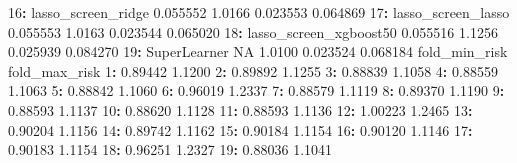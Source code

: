 \documentclass[12pt, krantz2,]{krantz}
\newenvironment{Shaded}{\begin{snugshade}}{\end{snugshade}}
\newcommand{\DecValTok}[1]{\textcolor[rgb]{0.06,0.06,0.06}{#1}}
\newcommand{\FloatTok}[1]{\textcolor[rgb]{0.06,0.06,0.06}{#1}}
\newcommand{\NormalTok}[1]{#1}
\newcommand{\OperatorTok}[1]{\textcolor[rgb]{0.43,0.43,0.43}{\textbf{#1}}}
\newcommand{\OtherTok}[1]{\textcolor[rgb]{0.37,0.37,0.37}{#1}}
\newcommand{\StringTok}[1]{\textcolor[rgb]{0.5,0.5,0.5}{#1}}
\theoremstyle{definition}
\theoremstyle{definition}
\theoremstyle{definition}
\newcommand{\1}{\mathbbm{1}}
\begin{document}
\begin{Shaded}
\begin{Highlighting}[]
\DecValTok{16}\OperatorTok{:}\StringTok{            }\NormalTok{lasso_screen_ridge     }\FloatTok{0.055552} \FloatTok{1.0166} \FloatTok{0.023553} \FloatTok{0.064869}
\DecValTok{17}\OperatorTok{:}\StringTok{            }\NormalTok{lasso_screen_lasso     }\FloatTok{0.055553} \FloatTok{1.0163} \FloatTok{0.023544} \FloatTok{0.065020}
\DecValTok{18}\OperatorTok{:}\StringTok{        }\NormalTok{lasso_screen_xgboost50     }\FloatTok{0.055516} \FloatTok{1.1256} \FloatTok{0.025939} \FloatTok{0.084270}
\DecValTok{19}\OperatorTok{:}\StringTok{                  }\NormalTok{SuperLearner           }\OtherTok{NA} \FloatTok{1.0100} \FloatTok{0.023524} \FloatTok{0.068184}
\NormalTok{    fold_min_risk fold_max_risk}
 \DecValTok{1}\OperatorTok{:}\StringTok{       }\FloatTok{0.89442}        \FloatTok{1.1200}
 \DecValTok{2}\OperatorTok{:}\StringTok{       }\FloatTok{0.89892}        \FloatTok{1.1255}
 \DecValTok{3}\OperatorTok{:}\StringTok{       }\FloatTok{0.88839}        \FloatTok{1.1058}
 \DecValTok{4}\OperatorTok{:}\StringTok{       }\FloatTok{0.88559}        \FloatTok{1.1063}
 \DecValTok{5}\OperatorTok{:}\StringTok{       }\FloatTok{0.88842}        \FloatTok{1.1060}
 \DecValTok{6}\OperatorTok{:}\StringTok{       }\FloatTok{0.96019}        \FloatTok{1.2337}
 \DecValTok{7}\OperatorTok{:}\StringTok{       }\FloatTok{0.88579}        \FloatTok{1.1119}
 \DecValTok{8}\OperatorTok{:}\StringTok{       }\FloatTok{0.89370}        \FloatTok{1.1190}
 \DecValTok{9}\OperatorTok{:}\StringTok{       }\FloatTok{0.88593}        \FloatTok{1.1137}
\DecValTok{10}\OperatorTok{:}\StringTok{       }\FloatTok{0.88620}        \FloatTok{1.1128}
\DecValTok{11}\OperatorTok{:}\StringTok{       }\FloatTok{0.88593}        \FloatTok{1.1136}
\DecValTok{12}\OperatorTok{:}\StringTok{       }\FloatTok{1.00223}        \FloatTok{1.2465}
\DecValTok{13}\OperatorTok{:}\StringTok{       }\FloatTok{0.90204}        \FloatTok{1.1156}
\DecValTok{14}\OperatorTok{:}\StringTok{       }\FloatTok{0.89742}        \FloatTok{1.1162}
\DecValTok{15}\OperatorTok{:}\StringTok{       }\FloatTok{0.90184}        \FloatTok{1.1154}
\DecValTok{16}\OperatorTok{:}\StringTok{       }\FloatTok{0.90120}        \FloatTok{1.1146}
\DecValTok{17}\OperatorTok{:}\StringTok{       }\FloatTok{0.90183}        \FloatTok{1.1154}
\DecValTok{18}\OperatorTok{:}\StringTok{       }\FloatTok{0.96251}        \FloatTok{1.2327}
\DecValTok{19}\OperatorTok{:}\StringTok{       }\FloatTok{0.88036}        \FloatTok{1.1041}
\end{Highlighting}
\end{Shaded}
\end{document}
